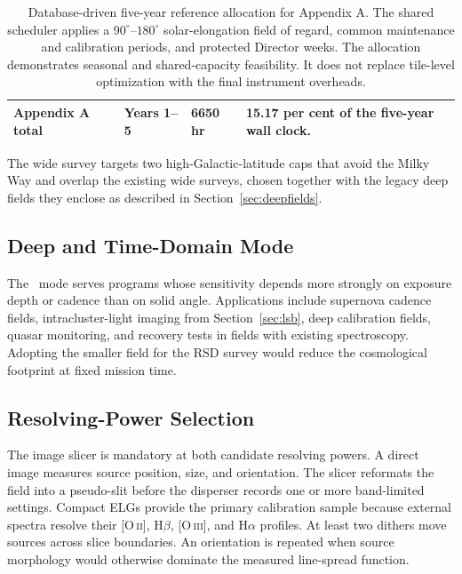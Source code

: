 \begin{table}[htbp]
\begin{tabularx}{\textwidth}{@{}
  >{\raggedright\arraybackslash}p{3.7cm}
  >{\raggedright\arraybackslash}p{2.25cm}
  >{\raggedright\arraybackslash}p{2.2cm}
  >{\raggedright\arraybackslash}X@{}}
\midrule
\textbf{Appendix A total} & \textbf{Years 1--5} & \textbf{6650 hr} & \textbf{15.17 per cent of the five-year wall clock.}\\
\bottomrule
\end{tabularx}
\caption{Database-driven five-year reference allocation for Appendix A. The shared scheduler applies a $90^\circ$--$180^\circ$ solar-elongation field of regard, common maintenance and calibration periods, and protected Director weeks. The allocation demonstrates seasonal and shared-capacity feasibility. It does not replace tile-level optimization with the final instrument overheads.}
\label{tab:timeline}
\end{table}



The wide survey targets two high-Galactic-latitude caps that avoid the Milky Way and overlap the existing wide surveys, chosen together with the legacy deep fields they enclose as described in Section~\ref{sec:deepfields}.

\subsection{Deep and Time-Domain Mode}

The \fovsmall\ mode serves programs whose sensitivity depends more strongly on exposure depth or cadence than on solid angle. Applications include supernova cadence fields, intracluster-light imaging from Section~\ref{sec:lsb}, deep calibration fields, quasar monitoring, and recovery tests in fields with existing spectroscopy. Adopting the smaller field for the RSD survey would reduce the cosmological footprint at fixed mission time.

\subsection{Resolving-Power Selection}

The image slicer is mandatory at both candidate resolving powers. A direct image measures source position, size, and orientation. The slicer reformats the field into a pseudo-slit before the disperser records one or more band-limited settings. Compact ELGs provide the primary calibration sample because external spectra resolve their [O\,\textsc{ii}], H$\beta$, [O\,\textsc{iii}], and H$\alpha$ profiles. At least two dithers move sources across slice boundaries. An orientation is repeated when source morphology would otherwise dominate the measured line-spread function.

